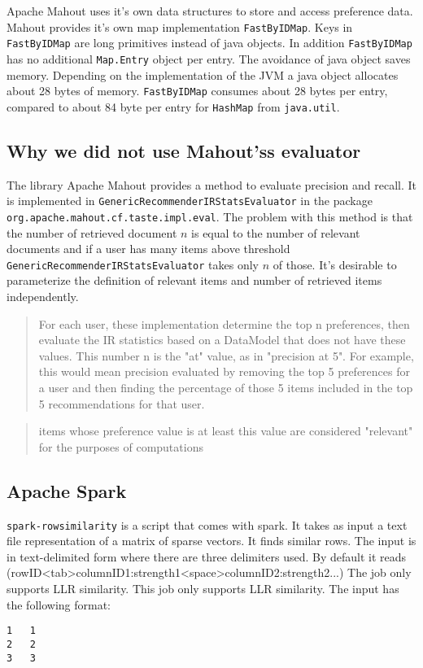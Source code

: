 \documentclass[twoside,a4paper]{article}
\begin{document}
Apache Mahout uses it's own data structures to store and access preference data. Mahout provides it's own map implementation \verb|FastByIDMap|. Keys in \verb|FastByIDMap| are long primitives instead of java objects. In addition \verb|FastByIDMap| has no additional \verb|Map.Entry| object per entry. The avoidance of java object saves memory. Depending on the implementation of the JVM a java object allocates about 28 bytes of memory. \verb|FastByIDMap| consumes about 28 bytes per entry, compared to about 84 byte per entry for \verb|HashMap| from \verb|java.util|.

\subsection{Why we did not use Mahout'ss evaluator}
\label{sec:mahouteval}

The library Apache Mahout provides a method to evaluate precision and recall. It is implemented in 
 \verb|GenericRecommenderIRStatsEvaluator| in the package \verb|org.apache.mahout.cf.taste.impl.eval|. The problem with this method is that the number of retrieved document $n$ is equal to the number of relevant documents and if a user has many items above threshold  \verb|GenericRecommenderIRStatsEvaluator| takes only $n$ of those. It's desirable to parameterize the definition of relevant items and number of retrieved items independently.

\begin{quote}
For each user, these implementation determine the top n preferences, then evaluate the IR statistics based on a DataModel that does not have these values. This number n is the "at" value, as in "precision at 5". For example, this would mean precision evaluated by removing the top 5 preferences for a user and then finding the percentage of those 5 items included in the top 5 recommendations for that user. 
\end{quote}

\begin{quote}
  items whose preference value is at least this value are considered "relevant" for the purposes of computations
\end{quote}


\subsection{Apache Spark}
\label{sec:spark}
\verb|spark-rowsimilarity| is a script that comes with spark. It takes as input a text file representation of a matrix of sparse vectors. It finds similar rows. The input is in text-delimited form where there are three delimiters used. By default it reads (rowID<tab>columnID1:strength1<space>columnID2:strength2...) The job only supports LLR similarity. This job only supports LLR similarity.
The input has the following format:
\begin{verbatim}
1	1
2	2
3	3 
\end{verbatim}
\end{document}
